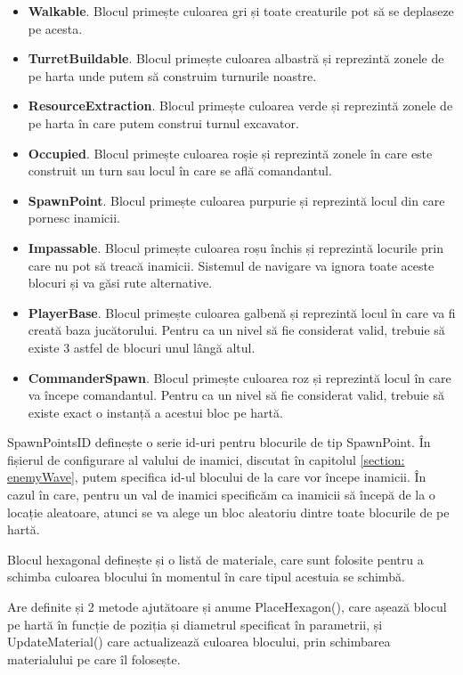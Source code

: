 \documentclass[12pt, a4paper]{article}
\begin{document}
	\begin{itemize}
		\item \textbf{Walkable}. Blocul primește culoarea gri și toate creaturile pot să se deplaseze pe acesta.
		\item \textbf{TurretBuildable}. Blocul primește culoarea albastră și reprezintă zonele de pe harta unde putem să construim turnurile noastre.
		\item \textbf{ResourceExtraction}. Blocul primește culoarea verde și reprezintă zonele de pe harta în care putem construi turnul excavator.
		\item \textbf{Occupied}. Blocul primește culoarea roșie și reprezintă zonele în care este construit un turn sau locul în care se află comandantul.
		\item \textbf{SpawnPoint}. Blocul primește culoarea purpurie și reprezintă locul din care pornesc inamicii.
		\item \textbf{Impassable}. Blocul primește culoarea roșu închis și reprezintă locurile prin care nu pot să treacă inamicii. Sistemul de navigare va ignora toate aceste blocuri și va găsi rute alternative.
		\item \textbf{PlayerBase}. Blocul primește culoarea galbenă și reprezintă locul în care va fi creată baza jucătorului. Pentru ca un nivel să fie considerat valid, trebuie să existe 3 astfel de blocuri unul lângă altul.
		\item \textbf{CommanderSpawn}. Blocul primește culoarea roz și reprezintă locul în care va începe comandantul. Pentru ca un nivel să fie considerat valid, trebuie să existe exact o instanță a acestui bloc pe hartă.
	\end{itemize}
	
	SpawnPointsID definește o serie id-uri pentru blocurile de tip SpawnPoint. În fișierul de configurare al valului de inamici, discutat în capitolul \ref{section: enemyWave}, putem specifica id-ul blocului de la care vor începe inamicii. În cazul în care, pentru un val de inamici specificăm ca inamicii să începă de la o locație aleatoare, atunci se va alege un bloc aleatoriu dintre toate blocurile de pe hartă.
	\newline
	
	Blocul hexagonal definește și o listă de materiale, care sunt folosite pentru a schimba culoarea blocului în momentul în care tipul acestuia se schimbă.
	\newline
	
	Are definite și 2 metode ajutătoare și anume PlaceHexagon(), care așează blocul pe hartă în funcție de poziția și diametrul specificat în parametrii, și UpdateMaterial() care actualizează culoarea blocului, prin schimbarea materialului pe care îl folosește.
	\newline
	
\end{document}
